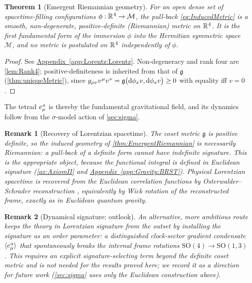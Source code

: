 \documentclass[pdflatex,sn-mathphys-num]{sn-jnl}
\theoremstyle{thmstyleone}
\newtheorem{theorem}{Theorem}
\theoremstyle{thmstyletwo}%
\newtheorem{remark}{Remark}%
\theoremstyle{thmstylethree}%
\newcommand{\M}{\mathcal{M}}
\newcommand{\sm}{\hspace{.065em}}
\newcommand{\appref}[1]{\hyperref[#1]{Appendix~\ref*{#1}}}
\newcommand{\smexp}[1]{^{\sm #1}}
\begin{document}
\begin{theorem}[Emergent Riemannian geometry]\label{thm:EmergentRiemannian}
For an open dense set of spacetime-filling configurations
$\phi:\mathbb R\smexp{4}\to\M$, the pull-back \eqref{eq:InducedMetric} is a
smooth, non-degenerate, positive-definite (Riemannian) metric on
$\mathbb R\smexp{4}$. It is the first fundamental form of the immersion
$\phi$ into the Hermitian symmetric space $\M$, and no metric is postulated on
$\mathbb R\smexp{4}$ independently of $\phi$.
\end{theorem}

\begin{proof}
See \appref{app:Lorentz:Lorentz}. Non-degeneracy and rank four are
\autoref{lem:Rank4}; positive-definiteness is inherited from that of
$\mathfrak g$ (\autoref{thm:uniqueMetric}), since
$g_{\mu\nu}v\smexp{\mu}v\smexp{\nu}=\mathfrak g\bigl(\mathrm d\phi_x v,\mathrm
d\phi_x v\bigr)\ge0$ with equality iff $v=0$.
\end{proof}

The tetrad $e_\mu\smexp{ a}$ is thereby the fundamental gravitational field, and
its dynamics follow from the $\sigma$-model action of \autoref{sec:sigma}.

\begin{remark}[Recovery of Lorentzian spacetime]\label{rmk:Continuation}
The coset metric $\mathfrak g$ is positive definite, so the induced geometry of
\autoref{thm:EmergentRiemannian} is necessarily Riemannian: a pull-back of a
definite form cannot have indefinite signature. This is the appropriate object,
because the functional integral is defined in Euclidean signature
(\autoref{ax:AxiomII} and \appref{app:Gravity:BRST}). Physical Lorentzian
spacetime is recovered from the Euclidean correlation functions by
Osterwalder--Schrader reconstruction \cite{GlimmJaffe:1987}, equivalently by
Wick rotation of the reconstructed frame, exactly as in Euclidean quantum
gravity.
\end{remark}

\begin{remark}[Dynamical signature: outlook]\label{rmk:DynamicalSignature}
An alternative, more ambitious route keeps the theory in Lorentzian signature
from the outset by installing the signature as an order parameter: a
distinguished clock-sector gradient condensate
$\langle e_{\mu}\smexp{a}\rangle$ that spontaneously breaks the internal frame
rotations $\mathrm{SO}(4)\to\mathrm{SO}(1,3)$. This requires an explicit
signature-selecting term beyond the definite coset metric and is not needed for
the results proved here; we record it as a direction for future work
(\autoref{sec:sigma} uses only the Euclidean construction above).
\end{remark}
\end{document}
